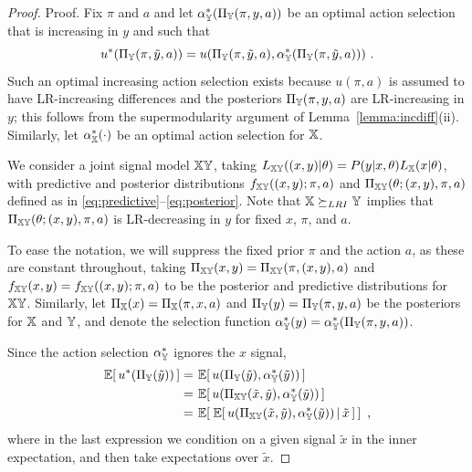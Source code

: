\begin{proof}{Proof.}
Fix $\pi$ and $a$ and let $\alpha_{\mathbb{Y}}^*(\Pi_{\mathbb{Y}}(\pi, y,a))$ be an
optimal action selection that is increasing in $y$ and such that
$$u^*(\Pi_\iY(\pi,\tilde{y},a)) =
u(\Pi_\iY(\pi,\tilde{y},a),\alpha_\iY^*(\Pi_\iY(\pi, \tilde{y},a)))\ .$$
Such an optimal increasing action selection exists because $u(\pi,a)$
is assumed to have LR-increasing differences and the posteriors
$\Pi_{\mathbb{Y}}(\pi,y,a)$ are LR-increasing in $y$; this follows from the
supermodularity argument of Lemma~\ref{lemma:incdiff}(ii). Similarly,
let $\alpha_{\mathbb{X}}^*(\cdot)$ be an optimal action selection for ${\mathbb{X}}$.

We consider a joint signal model ${\mathbb{XY}}$, taking
$L_{\mathbb{XY}}((x,y)|\theta) = P(y|x,\theta) L_{\mathbb{X}}(x|\theta)$, with predictive
and posterior distributions $f_{\mathbb{XY}}((x,y); \pi,a)$ and
$\Pi_{\mathbb{XY}}(\theta; (x,y),\pi,a)$ defined as in
\eqref{eq:predictive}--\eqref{eq:posterior}. Note that ${\mathbb{X}} \succeq_{LRI} {\mathbb{Y}}$
implies that $\Pi_{\mathbb{XY}}(\theta; (x,y),\pi,a)$ is LR-decreasing in $y$
for fixed $x$, $\pi$, and $a$.

To ease the notation, we will suppress the fixed prior $\pi$ and the
action $a$, as these are constant throughout, taking
$\Pi_{\mathbb{XY}}(x,y) = \Pi_{\mathbb{XY}}(\pi,(x,y),a)$ and
$f_{\mathbb{XY}}(x,y) = f_{\mathbb{XY}}((x,y); \pi,a)$ to be the posterior and predictive
distributions for ${\mathbb{XY}}$. Similarly, let
$\Pi_{\mathbb{X}}(x) = \Pi_{\mathbb{X}}(\pi,x,a)$ and $\Pi_{\mathbb{Y}}(y) = \Pi_{\mathbb{Y}}(\pi,y,a)$ be
the posteriors for ${\mathbb{X}}$ and ${\mathbb{Y}}$, and denote the selection function
$\alpha_{\mathbb{Y}}^*(y) = \alpha_{\mathbb{Y}}^*(\Pi_{\mathbb{Y}}(\pi, y,a))$.

Since the action selection $\alpha_{\mathbb{Y}}^*$ ignores the $x$ signal,
\begin{align}
\ev{u^*(\Pi_\iY(\tilde{y}))}
&= \ev{u(\Pi_\iY(\tilde{y}),\alpha_\iY^*(\tilde{y}))} \notag\\
&= \ev{u(\Pi_\iXY(\tilde{x},\tilde{y}),\alpha_\iY^*(\tilde{y}))}
  \notag\\
&= \ev{\cev{u(\Pi_\iXY(\tilde{x},\tilde{y}),\alpha_\iY^*(\tilde{y}))}
  {\tilde{x}}} \ , \label{eq:nested_expectation}
\end{align}
where in the last expression we condition on a given signal $\tilde{x}$
in the inner expectation, and then take expectations over $\tilde{x}$.


\end{proof}
